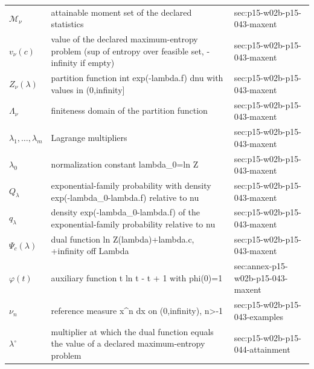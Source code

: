 \begin{longtable}{@{}p{}p{}p{}@{}}
\(\mathcal M_\nu\) & attainable moment set of the declared statistics & sec:\allowbreak{}p15-\allowbreak{}w02b-\allowbreak{}p15-\allowbreak{}043-\allowbreak{}maxent \\
\(v_\nu(c)\) & value of the declared maximum-entropy problem (sup of entropy over feasible set, -infinity if empty) & sec:\allowbreak{}p15-\allowbreak{}w02b-\allowbreak{}p15-\allowbreak{}043-\allowbreak{}maxent \\
\(Z_\nu(\lambda)\) & partition function int exp(-lambda.f) dnu with values in (0,infinity] & sec:\allowbreak{}p15-\allowbreak{}w02b-\allowbreak{}p15-\allowbreak{}043-\allowbreak{}maxent \\
\(\Lambda_\nu\) & finiteness domain of the partition function & sec:\allowbreak{}p15-\allowbreak{}w02b-\allowbreak{}p15-\allowbreak{}043-\allowbreak{}maxent \\
\(\lambda_1,\allowbreak \ldots,\allowbreak \lambda_m\) & Lagrange multipliers & sec:\allowbreak{}p15-\allowbreak{}w02b-\allowbreak{}p15-\allowbreak{}043-\allowbreak{}maxent \\
\(\lambda_0\) & normalization constant lambda\_0=ln Z & sec:\allowbreak{}p15-\allowbreak{}w02b-\allowbreak{}p15-\allowbreak{}043-\allowbreak{}maxent \\
\(Q_\lambda\) & exponential-family probability with density exp(-lambda\_0-lambda.f) relative to nu & sec:\allowbreak{}p15-\allowbreak{}w02b-\allowbreak{}p15-\allowbreak{}043-\allowbreak{}maxent \\
\(q_\lambda\) & density exp(-lambda\_0-lambda.f) of the exponential-family probability relative to nu & sec:\allowbreak{}p15-\allowbreak{}w02b-\allowbreak{}p15-\allowbreak{}043-\allowbreak{}maxent \\
\(\Psi_c(\lambda)\) & dual function ln Z(lambda)+lambda.c, +infinity off Lambda & sec:\allowbreak{}p15-\allowbreak{}w02b-\allowbreak{}p15-\allowbreak{}043-\allowbreak{}maxent \\
\(\varphi(t)\) & auxiliary function t ln t - t + 1 with phi(0)=1 & sec:\allowbreak{}annex-\allowbreak{}p15-\allowbreak{}w02b-\allowbreak{}p15-\allowbreak{}043-\allowbreak{}maxent \\
\(\nu_n\) & reference measure x\^{}n dx on (0,infinity), n>-1 & sec:\allowbreak{}p15-\allowbreak{}w02b-\allowbreak{}p15-\allowbreak{}043-\allowbreak{}examples \\
\(\lambda^\circ\) & multiplier at which the dual function equals the value of a declared maximum-entropy problem & sec:\allowbreak{}p15-\allowbreak{}w02b-\allowbreak{}p15-\allowbreak{}044-\allowbreak{}attainment \\

\end{longtable}
